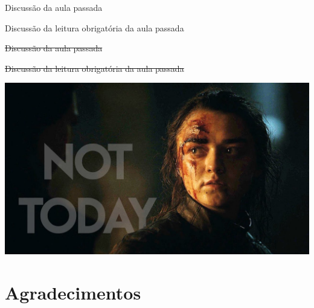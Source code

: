 \documentclass{beamer}
\begin{document}
\begin{frame}{Discussão da aula passada}
  \begin{block}{}
    Discussão da leitura obrigatória da aula passada
  \end{block}
  \begin{center}
    \vfill
  \end{center}
\end{frame}

\begin{frame}{\sout{Discussão da aula passada}}
  \begin{block}{}
    \sout{Discussão da leitura obrigatória da aula passada}
  \end{block}
  \begin{center}
    \vfill
    \includegraphics[height=.5\textheight]{Encerramento/arya-nottoday}
  \end{center}
\end{frame}

\section{Agradecimentos}
\end{document}
